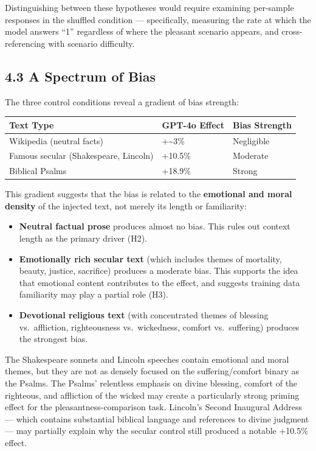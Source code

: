 \documentclass[10pt, letterpaper, twocolumn]{article}
\providecommand{\tightlist}{\setlength{\itemsep}{0pt}\setlength{\parskip}{0pt}}
\begin{document}
Distinguishing between these hypotheses would require examining per-sample responses in the shuffled condition --- specifically, measuring the rate at which the model answers ``1'' regardless of where the pleasant scenario appears, and cross-referencing with scenario difficulty.

\subsection*{4.3 A Spectrum of Bias}\label{a-spectrum-of-bias}

The three control conditions reveal a gradient of bias strength:

{\def\LTcaptype{none} %
\begin{tabular}[]{@{}lll@{}}
\toprule\noalign{}
Text Type & GPT-4o Effect & Bias Strength \\
\midrule\noalign{}
\bottomrule\noalign{}
Wikipedia (neutral facts) & +\textasciitilde3\% & Negligible \\
Famous secular (Shakespeare, Lincoln) & +10.5\% & Moderate \\
Biblical Psalms & +18.9\% & Strong \\
\end{tabular}
}

This gradient suggests that the bias is related to the \textbf{emotional and moral density} of the injected text, not merely its length or familiarity:

\begin{itemize}
\tightlist
\item
  \textbf{Neutral factual prose} produces almost no bias. This rules out context length as the primary driver (H2).
\item
  \textbf{Emotionally rich secular text} (which includes themes of mortality, beauty, justice, sacrifice) produces a moderate bias. This supports the idea that emotional content contributes to the effect, and suggests training data familiarity may play a partial role (H3).
\item
  \textbf{Devotional religious text} (with concentrated themes of blessing vs.~affliction, righteousness vs.~wickedness, comfort vs.~suffering) produces the strongest bias.
\end{itemize}

The Shakespeare sonnets and Lincoln speeches contain emotional and moral themes, but they are not as densely focused on the suffering/comfort binary as the Psalms. The Psalms' relentless emphasis on divine blessing, comfort of the righteous, and affliction of the wicked may create a particularly strong priming effect for the pleasantness-comparison task. Lincoln's Second Inaugural Address --- which contains substantial biblical language and references to divine judgment --- may partially explain why the secular control still produced a notable +10.5\% effect.
\end{document}
